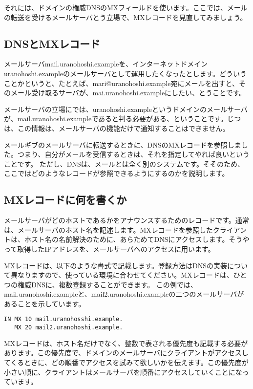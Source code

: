 それには、ドメインの権威DNSのMXフィールドを使います。ここでは、メールの転送を受けるメールサーバとう立場で、MXレコードを見直してみましょう。

\subsection{DNSとMXレコード}

メールサーバmail.uranohoshi.exampleを、インターネットドメインuranohoshi.exampleのメールサーバとして運用したくなったとします。どういうことかというと、たとえば、mari@uranohoshi.example宛にメールを出すと、そのメール受け取るサーバが、mai.uranohoshi.exampleにしたい、とうことです。

メールサーバの立場にでは、uranohoshi.exampleというドメインのメールサーバが、mail.uranohoshi.exampleであると判る必要がある、ということです。じつは、この情報は、メールサーバの機能だけで通知することはできません。

メールギブのメールサーバに転送するときに、DNSのMXレコードを参照しました。つまり、自分がメールを受信するときは、それを指定してやれば良いということです。
ただし、DNSは、メールとは全く別のシステムです。そそのため、ここではどのようなレコードが参照できるようにするのかを説明します。

\subsection{MXレコードに何を書くか}

メールサーバがどのホストであるかをアナウンスするためのレコードです。通常は、メールサーバのホスト名を記述します。MXレコードを参照したクライアントは、ホスト名の名前解決のために、あらためてDNSにアクセスします。そうやって取得したIPアドレスを、メールサーバへのアクセスに用います。

MXレコードは、以下のような書式で記載します。登録方法はDNSの実装について異なりますので、使っている環境に合わせてください。MXレコードは、ひとつの権威DNSに、複数登録することができます。
この例では、mail.uranohoshi.exampleと、mail2.uranohoshi.exampleの二つのメールサーバがあることを示しています。

\begin{verbatim}
IN MX 10 mail.uranohosshi.example.
   MX 20 mail2.uranohoshi.example.
\end{verbatim}

MXレコードは、ホスト名だけでなく、整数で表される優先度も記載する必要があります。この優先度で、ドメインのメールサーバにクライアントがアクセスしてくるときに、どの順番でアクセスを試みて欲しいかを伝えます。この優先度が小さい順に、クライアントはメールサーバを順番にアクセスしていくことになっています。


